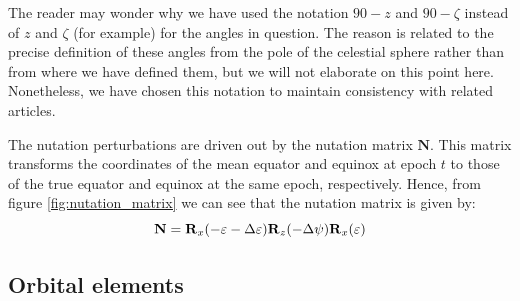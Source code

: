 \documentclass[../main.tex]{subfiles}
\begin{document}
The reader may wonder why we have used the notation $90-z$ and $90-\zeta$ instead of $z$ and $\zeta$ (for example) for the angles in question. The reason is related to the precise definition of these angles from the pole of the celestial sphere rather than from where we have defined them, but we will not elaborate on this point here. Nonetheless, we have chosen this notation to maintain consistency with related articles.

The nutation perturbations are driven out by the nutation matrix $\mathbf{N}$. This matrix transforms the coordinates of the mean equator and equinox at epoch $t$ to those of the true equator and equinox at the same epoch, respectively. Hence, from figure \cref{fig:nutation_matrix} we can see that the nutation matrix is given by:
\begin{equation}
  \mathbf{N}=\boldsymbol{\mathrm{R}}_x(-\varepsilon-\Delta \varepsilon)\boldsymbol{\mathrm{R}}_z(-\Delta \psi)\boldsymbol{\mathrm{R}}_x(\varepsilon)
\end{equation}
\subsection{Orbital elements}
\end{document}
